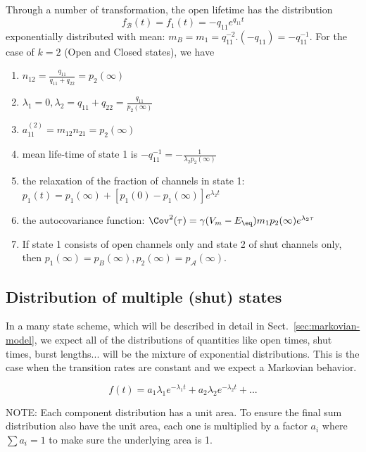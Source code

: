Through a number of transformation, the open lifetime has the distribution
\begin{equation}
f_\mathcal{B}(t) = f_1(t) = -q_{11}e^{q_{11}t}
\end{equation}
exponentially distributed with mean: $m_B = m_1 =
q_{11}^{-2}.(-q_{11})=-q_{11}^{-1}$. For the case of $k=2$ (Open and Closed
states), we have
\begin{enumerate}
  \item $n_{12}=\frac{q_{11}}{q_{11}+q_{22}} = p_2(\infty)$
  \item $\lambda_1=0, \lambda_2 = q_{11}+q_{22}=\frac{q_{11}}{p_2(\infty)}$
  \item $a_{11}^{(2)}=m_{12}n_{21}=p_2(\infty)$
  \item mean life-time of state 1 is
  $-q_{11}^{-1}=-\frac{1}{\lambda_2p_2(\infty)}$
  \item the relaxation of the fraction of channels in state 1:
  $p_1(t)=p_1(\infty)+ [p_1(0)-p_1(\infty)]e^{\lambda_2t}$
  \item the autocovariance function:
  $\Cov^2(\tau)=\gamma(V_m-E_\eq)m_1p_2(\infty)e^{\lambda_2\tau}$
  \item If state 1 consists of open channels only and state 2 of shut channels
  only, then $p_1(\infty)=p_B(\infty), p_2(\infty)=p_\mathcal{A}(\infty)$.
\end{enumerate}



\subsection{Distribution of multiple (shut) states}
\label{sec:multiple-shut-states}

\begin{framed}
  In a many state scheme, which will be described in detail in
  Sect.~\ref{sec:markovian-model}, we expect all of the distributions of
  quantities like open times, shut times, burst lengths... will be the
  mixture of exponential distributions. This is the case when the
  transition rates are constant and we expect a Markovian behavior.

  \begin{equation}
    \label{eq:851}
    f(t) = a_1\lambda_1 e^{-\lambda_1 t} + a_2\lambda_2 e^{-\lambda_2
      t} + ...
  \end{equation}

  NOTE: Each component distribution has a unit area. To ensure the
  final sum distribution also have the unit area, each one is
  multiplied by a factor $a_i$ where $\sum a_i = 1$ to make sure the
  underlying area is 1.
\end{framed}


